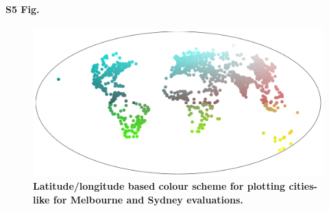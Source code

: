 \documentclass[10pt,letterpaper,hidelinks]{article}
\begin{document}
\paragraph*{S5 Fig.}
\begin{figure}[!htbp]
\centering    
\includegraphics[scale=0.25]{Images/PlosOne/Fig5.png} 
\caption{\bf Latitude/longitude based colour scheme for plotting cities-like for Melbourne and Sydney evaluations.}    
 \label{fig:colorscheme}  
\end{figure} 
\end{document}
